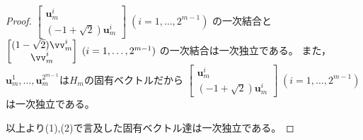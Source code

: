 \begin{proof}
                $
                    \begin{bmatrix}
                        \bm{u}_m^i \\
                        (-1+\sqrt{2})\bm{u}_m^i
                    \end{bmatrix}
                    \;(i=1,\dotsc,2^{m-1})
                $
                の一次結合と
                $
                    \begin{bmatrix}
                        (1-\sqrt{2})\vv_m^i \\
                        \vv_m^i
                    \end{bmatrix}
                    \;(i=1,\dotsc,2^{m-1})
                $
                の一次結合は一次独立である。
                また，$\bm{u}_m^1,\dotsc,\bm{u}_m^{2^{m-1}}$は$H_m$の固有ベクトルだから
                $
                    \begin{bmatrix}
                        \bm{u}_m^i \\
                        (-1+\sqrt{2})\bm{u}_m^i
                    \end{bmatrix}
                    \;(i=1,\dotsc,2^{m-1})
                $
                は一次独立である。
                \par
                以上より(1),(2)で言及した固有ベクトル達は一次独立である。
            \end{proof}
